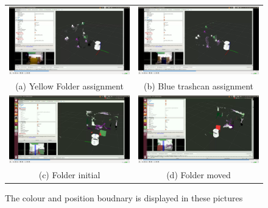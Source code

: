 \documentclass[twoside,hidelinks]{article}
\begin{document}
\begin{figure}[h!]

\begin{tabular}{cc}
  \includegraphics[width=.5\textwidth]{colorBound} &   \includegraphics[width=.5\textwidth]{colorBound2} \\
(a) Yellow Folder assignment  & (b) Blue trashcan assignment \\[6pt]
	\includegraphics[width=.5\textwidth]{posBound} &   \includegraphics[width=.5\textwidth]{posBound2} \\
(c) Folder initial  & (d) Folder moved \\[6pt]
\end{tabular}
\caption{The colour and position boudnary is displayed in these pictures}
  \label{pip:bounds}
\end{figure}
\end{document}
